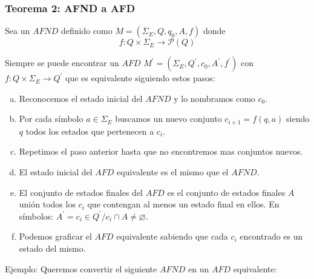\documentclass[12pt]{article}
\begin{document}
\subsubsection{Teorema 2: AFND a AFD}

Sea un $ AFND $ definido como $ M=(\Sigma_{E},Q,q_{0},A,f) $ donde
\[
f:Q\times \Sigma_{E} \to \mathcal{P}(Q) 
\]

Siempre se puede encontrar un $ AFD $ $ M^{\prime}=(\Sigma_{E},Q^{\prime},c_{0},A^{\prime},f^{\prime}) $ con $ f:Q\times \Sigma_{E} \to Q^{\prime} $ que es equivalente siguiendo estos pasos:
\begin{enumerate}[a)]
  \item Reconocemos el estado inicial del $ AFND $ y lo nombramos como $ c_{0} $.

  \item Por cada símbolo $ a \in \Sigma_{E} $ buscamos un nuevo conjunto $ c_{i+1}=f(q,a) $ siendo $ q $ todos los estados que pertenecen a $ c_{i} $.

  \item Repetimos el paso anterior hasta que no encontremos mas conjuntos nuevos.

  \item El estado inicial del $ AFD $ equivalente es el mismo que el $ AFND $.

  \item El conjunto de estados finales del $ AFD $ es el conjunto de estados finales $ A $ unión todos los $ c_{i} $ que contengan al menos un estado final en ellos. En símbolos: $ A^{\prime}=c_{i} \in Q^{\prime} / c_{i} \cap A\neq  \varnothing  $.

  \item Podemos graficar el $ AFD $ equivalente sabiendo que cada $ c_{i} $ encontrado es un estado del mismo.
\end{enumerate}

Ejemplo: Queremos convertir el siguiente $ AFND $ en un $ AFD $ equivalente:
\begin{center}
\end{center}
\end{document}
